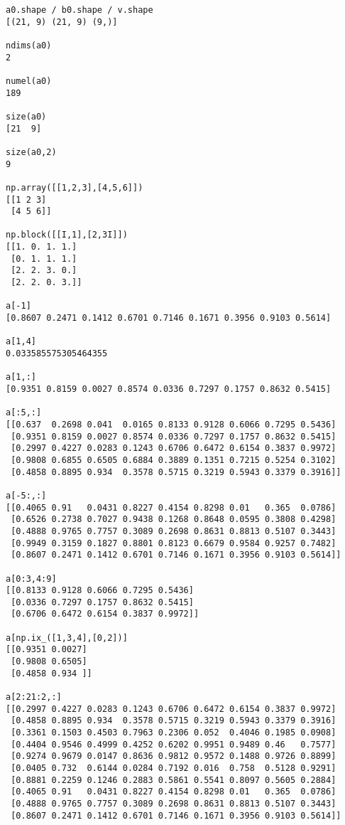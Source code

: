 \begin{verbatim}
a0.shape / b0.shape / v.shape
[(21, 9) (21, 9) (9,)]

ndims(a0)
2

numel(a0)
189

size(a0)
[21  9]

size(a0,2)
9

np.array([[1,2,3],[4,5,6]])
[[1 2 3]
 [4 5 6]]

np.block([[I,1],[2,3I]])
[[1. 0. 1. 1.]
 [0. 1. 1. 1.]
 [2. 2. 3. 0.]
 [2. 2. 0. 3.]]

a[-1]
[0.8607 0.2471 0.1412 0.6701 0.7146 0.1671 0.3956 0.9103 0.5614]

a[1,4]
0.033585575305464355

a[1,:]
[0.9351 0.8159 0.0027 0.8574 0.0336 0.7297 0.1757 0.8632 0.5415]

a[:5,:]
[[0.637  0.2698 0.041  0.0165 0.8133 0.9128 0.6066 0.7295 0.5436]
 [0.9351 0.8159 0.0027 0.8574 0.0336 0.7297 0.1757 0.8632 0.5415]
 [0.2997 0.4227 0.0283 0.1243 0.6706 0.6472 0.6154 0.3837 0.9972]
 [0.9808 0.6855 0.6505 0.6884 0.3889 0.1351 0.7215 0.5254 0.3102]
 [0.4858 0.8895 0.934  0.3578 0.5715 0.3219 0.5943 0.3379 0.3916]]

a[-5:,:]
[[0.4065 0.91   0.0431 0.8227 0.4154 0.8298 0.01   0.365  0.0786]
 [0.6526 0.2738 0.7027 0.9438 0.1268 0.8648 0.0595 0.3808 0.4298]
 [0.4888 0.9765 0.7757 0.3089 0.2698 0.8631 0.8813 0.5107 0.3443]
 [0.9949 0.3159 0.1827 0.8801 0.8123 0.6679 0.9584 0.9257 0.7482]
 [0.8607 0.2471 0.1412 0.6701 0.7146 0.1671 0.3956 0.9103 0.5614]]

a[0:3,4:9]
[[0.8133 0.9128 0.6066 0.7295 0.5436]
 [0.0336 0.7297 0.1757 0.8632 0.5415]
 [0.6706 0.6472 0.6154 0.3837 0.9972]]

a[np.ix_([1,3,4],[0,2])]
[[0.9351 0.0027]
 [0.9808 0.6505]
 [0.4858 0.934 ]]

a[2:21:2,:]
[[0.2997 0.4227 0.0283 0.1243 0.6706 0.6472 0.6154 0.3837 0.9972]
 [0.4858 0.8895 0.934  0.3578 0.5715 0.3219 0.5943 0.3379 0.3916]
 [0.3361 0.1503 0.4503 0.7963 0.2306 0.052  0.4046 0.1985 0.0908]
 [0.4404 0.9546 0.4999 0.4252 0.6202 0.9951 0.9489 0.46   0.7577]
 [0.9274 0.9679 0.0147 0.8636 0.9812 0.9572 0.1488 0.9726 0.8899]
 [0.0405 0.732  0.6144 0.0284 0.7192 0.016  0.758  0.5128 0.9291]
 [0.8881 0.2259 0.1246 0.2883 0.5861 0.5541 0.8097 0.5605 0.2884]
 [0.4065 0.91   0.0431 0.8227 0.4154 0.8298 0.01   0.365  0.0786]
 [0.4888 0.9765 0.7757 0.3089 0.2698 0.8631 0.8813 0.5107 0.3443]
 [0.8607 0.2471 0.1412 0.6701 0.7146 0.1671 0.3956 0.9103 0.5614]]


\end{verbatim}
